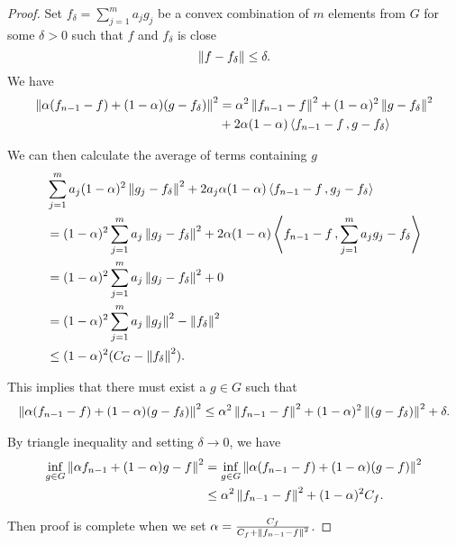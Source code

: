 \begin{proof}

     Set $f_{\delta} = \sum_{j=1}^m a_j g_j$ be a convex combination
    of $m$ elements from $G$ for some $\delta > 0$ such that $f$ and
    $f_{\delta}$ is close
    \begin{equation}
        \left\| f - f_{\delta} \right\| \leq \delta.
    \end{equation}
    We have
    \begin{align}
        \left\| \alpha (f_{n-1} - f) + (1-\alpha) (g - f_{\delta}) \right\|^2
        &= \alpha^2 \left\| f_{n-1} - f \right\|^2 + (1-\alpha)^2 \left\| g - f_{\delta} \right\|^2 \\
        &+ 2 \alpha (1-\alpha) \left\langle f_{n-1}-f\, , g - f_{\delta} \right\rangle
    \end{align}

    We can then calculate the average of terms containing $g$
    \begin{align}
        &\sum_{j=1}^m a_j (1-\alpha)^2 \left\| g_j - f_{\delta} \right\|^2 + 
        2 a_j \alpha (1-\alpha) \left\langle f_{n-1}-f\, , g_j - f_{\delta} \right\rangle \\
        &= (1-\alpha)^2 \sum_{j=1}^m a_j \left\| g_j - f_{\delta} \right\|^2 
        + 2 \alpha (1-\alpha) \left\langle f_{n-1}-f\, , \sum_{j=1}^m a_j g_j - f_{\delta} \right\rangle\\
        &= (1-\alpha)^2 \sum_{j=1}^m a_j \left\| g_j - f_{\delta} \right\|^2 + 0 \\
        &= (1-\alpha)^2 \sum_{j=1}^m a_j \left\| g_j \right\|^2 - \left\| f_{\delta} \right\|^2 \\
        &\leq (1-\alpha)^2 (C_G - \left\| f_{\delta} \right\|^2).
    \end{align}

    This implies that there must exist a $g \in G$ such that
    \begin{align}
        \left\| \alpha (f_{n-1} - f) + (1-\alpha) (g - f_{\delta}) \right\|^2
        \leq \alpha^2 \left\| f_{n-1} - f \right\|^2 + 
        (1-\alpha)^2 \left\| (g - f_{\delta}) \right\|^2 + \delta.
    \end{align}

    By triangle inequality and setting $\delta \to 0$, we have
    \begin{align}
        \inf_{g\in G} \left\| \alpha f_{n-1} + (1-\alpha) g - f \right\|^2
        &= \inf_{g\in G} \left\| \alpha (f_{n-1} - f) + (1-\alpha) (g - f) \right\|^2 \\
        &\leq \alpha^2 \left\| f_{n-1} - f \right\|^2 + (1-\alpha)^2 C_f.
    \end{align}

    Then proof is complete when we set $\alpha = \frac{C_f}{C_f + \left\| f_{n-1}
    - f \right\|^2}$.
\end{proof}

